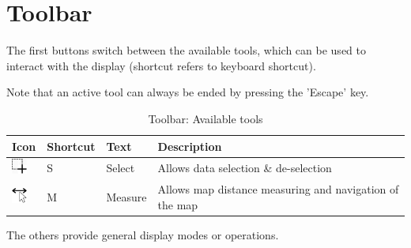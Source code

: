 \section{Toolbar}

The first buttons switch between the available tools, which can be used to interact with the display (shortcut refers to keyboard shortcut).

Note that an active tool can always be ended by pressing the 'Escape' key. 

\begin{table}[H]
  \center
  \begin{tabular}{ | l | l | l | l |}
    \hline
    \textbf{Icon} & \textbf{Shortcut} & \textbf{Text} & \textbf{Description} \\ \hline
    \includegraphics[width=0.5cm,frame]{../../data/icons/select_action.png} & S & Select & Allows data selection \& de-selection \\ \hline
    \includegraphics[width=0.5cm,frame]{../../data/icons/measure_action.png} & M & Measure & Allows map distance measuring and navigation of the map \\ \hline
  \end{tabular}
  \caption{Toolbar: Available tools}
\end{table}

The others provide general display modes or operations.

